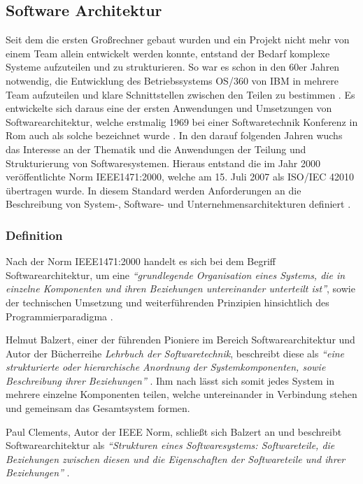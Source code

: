 \subsection{Software Architektur}

Seit dem die ersten Großrechner gebaut wurden und ein Projekt nicht mehr von einem Team allein entwickelt werden konnte, entstand der Bedarf komplexe Systeme aufzuteilen und zu strukturieren. So war es schon in den 60er Jahren notwendig, die Entwicklung des  Betriebssystems OS/360 von IBM in mehrere Team aufzuteilen und klare Schnittstellen zwischen den Teilen zu bestimmen \parencite{brooks_mythical_1995}. Es entwickelte sich daraus eine der ersten Anwendungen und Umsetzungen von  Softwarearchitektur, welche erstmalig 1969 bei einer Softwaretechnik Konferenz in Rom auch als solche bezeichnet wurde \parencite[vgl.][S. 12]{buxton_software_1970}. In den darauf folgenden Jahren wuchs das Interesse an der Thematik und die Anwendungen der Teilung und Strukturierung von Softwaresystemen.
Hieraus entstand die im Jahr 2000 veröffentlichte Norm IEEE1471:2000, welche am 15. Juli 2007 als  ISO/IEC  42010 übertragen wurde. In diesem Standard werden Anforderungen an die Beschreibung von System-, Software- und Unternehmensarchitekturen definiert \parencite{hilliard_isoiecieee_nodate}.

\subsubsection{Definition}
\label{sec:software-architect-definition}

Nach der Norm IEEE1471:2000 handelt es sich bei dem Begriff Softwarearchitektur, um eine  \textit{\enquote{grundlegende Organisation eines Systems, die in einzelne Komponenten und ihren Beziehungen untereinander unterteilt ist}}, sowie der technischen Umsetzung und weiterführenden Prinzipien hinsichtlich des Programmierparadigma \parencite[S. 12]{clements_comparing_2005}.

Helmut Balzert, einer der führenden Pioniere im Bereich Softwarearchitektur und Autor der Bücherreihe \textit{Lehrbuch der Softwaretechnik}, beschreibt diese als \textit{\enquote{eine strukturierte oder hierarchische Anordnung der Systemkomponenten, sowie Beschreibung ihrer Beziehungen}} \parencite[][S. 580]{balzert_lehrbuch_2011}. Ihm nach lässt sich somit jedes System in mehrere einzelne Komponenten teilen, welche untereinander in Verbindung stehen und gemeinsam das Gesamtsystem formen.

Paul Clements, Autor der IEEE Norm, schließt sich Balzert an und beschreibt Softwarearchitektur als \textit{\enquote{Strukturen eines Softwaresystems: Softwareteile, die Beziehungen zwischen diesen und die Eigenschaften der Softwareteile und ihrer Beziehungen}} \parencite[][S. 23]{clements_documenting_2010}.

